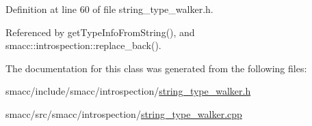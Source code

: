 Definition at line 60 of file string\+\_\+type\+\_\+walker.\+h.



Referenced by get\+Type\+Info\+From\+String(), and smacc\+::introspection\+::replace\+\_\+back().



The documentation for this class was generated from the following files\+:\begin{DoxyCompactItemize}
\item 
smacc/include/smacc/introspection/\hyperlink{string__type__walker_8h}{string\+\_\+type\+\_\+walker.\+h}\item 
smacc/src/smacc/introspection/\hyperlink{string__type__walker_8cpp}{string\+\_\+type\+\_\+walker.\+cpp}\end{DoxyCompactItemize}
